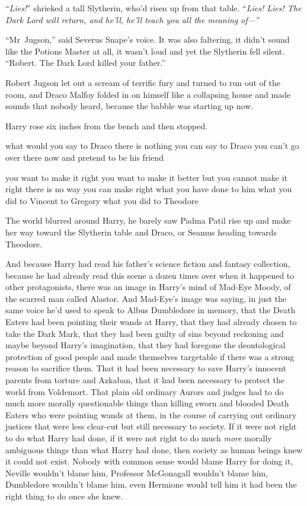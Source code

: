 “\emph{Lies!}” shrieked a tall Slytherin, who’d risen up from that table.
“\emph{Lies! Lies! The Dark Lord will return, and he’ll, he’ll teach you all
the meaning of—}”

“Mr~Jugson,” said Severus Snape’s voice. It was also faltering, it didn’t
sound like the Potions Master at all, it wasn’t loud and yet the Slytherin fell
silent. “Robert. The Dark Lord killed your father.”

Robert Jugson let out a scream of terrific fury and turned to run out of the
room, and Draco Malfoy folded in on himself like a collapsing house and made
sounds that nobody heard, because the babble was starting up now.

Harry rose six inches from the bench and then stopped.

what would you say to Draco there is nothing you can say to Draco you can’t go
over there now and pretend to be his friend

you want to make it right you want to make it better but you cannot make it
right there is no way you can make right what you have done to him what you did
to Vincent to Gregory what you did to Theodore

The world blurred around Harry, he barely saw Padma Patil rise up and make her
way toward the Slytherin table and Draco, or Seamus heading towards Theodore.

And because Harry had read his father’s science fiction and fantasy collection,
because he had already read this scene a dozen times over when it happened to
other protagonists, there was an image in Harry’s mind of Mad-Eye Moody, of the
scarred man called Alastor. And Mad-Eye’s image was saying, in just the same
voice he’d used to speak to Albus Dumbledore in memory, that the Death Eaters
had been pointing their wands at Harry, that they had already chosen to take
the Dark Mark, that they had been guilty of sins beyond reckoning and maybe
beyond Harry’s imagination, that they had foregone the deontological protection
of good people and made themselves targetable if there was a strong reason to
sacrifice them. That it had been necessary to save Harry’s innocent parents
from torture and Azkaban, that it had been necessary to protect the world from
Voldemort. That plain old ordinary Aurors and judges had to do much more
morally questionable things than killing sworn and blooded Death Eaters who
were pointing wands at them, in the course of carrying out ordinary justices
that were less clear-cut but still necessary to society. If it were not right
to do what Harry had done, if it were not right to do much \emph{more} morally
ambiguous things than what Harry had done, then society as human beings knew it
could not exist. Nobody with common sense would blame Harry for doing it,
Neville wouldn’t blame him, Professor McGonagall wouldn’t blame him, Dumbledore
wouldn’t blame him, even Hermione would tell him it had been the right thing to
do once she knew.

